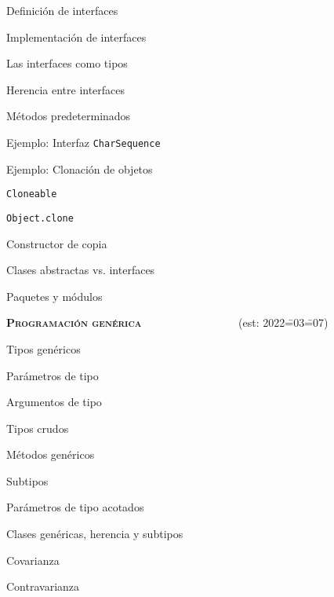 \begin{longenum}
\begin{longenum}
\begin{longenum}
            \item Definición de interfaces
            \item Implementación de interfaces
            \item Las interfaces como tipos
            \item Herencia entre interfaces
            \item Métodos predeterminados
            \item Ejemplo: Interfaz \texttt{CharSequence}
            \item Ejemplo: Clonación de objetos
            \begin{longenum}
                \item \texttt{Cloneable}
                \item \texttt{Object.clone}
                \item Constructor de copia
            \end{longenum}
            \item Clases abstractas vs. interfaces
        \end{longenum}
        \item Paquetes y módulos
    \end{longenum}
    \item \textbf{\textsc{Programación genérica}} \ \ \ \ \ \ \ \ \ \ \ \ \ \ \ \ \ (est: 2022\==03\==07)
    \begin{longenum}
        \item Tipos genéricos
        \begin{longenum}
            \item Parámetros de tipo
            \item Argumentos de tipo
            \item Tipos crudos
        \end{longenum}
        \item Métodos genéricos
        \item Subtipos
        \begin{longenum}
            \item Parámetros de tipo acotados
            \item Clases genéricas, herencia y subtipos
            \begin{longenum}
                \item Covarianza
                \item Contravarianza

\end{longenum}
\end{longenum}
\end{longenum}
\end{longenum}

